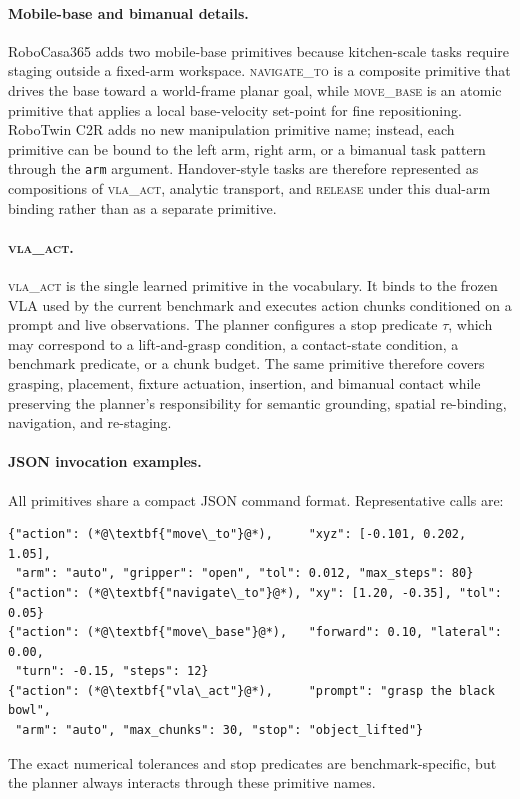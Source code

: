 \documentclass[11pt]{article}
\begin{document}
\paragraph{Mobile-base and bimanual details.}
RoboCasa365 adds two mobile-base primitives because kitchen-scale tasks require staging outside a fixed-arm workspace. \textsc{navigate\_to} is a composite primitive that drives the base toward a world-frame planar goal, while \textsc{move\_base} is an atomic primitive that applies a local base-velocity set-point for fine repositioning. RoboTwin C2R adds no new manipulation primitive name; instead, each primitive can be bound to the left arm, right arm, or a bimanual task pattern through the \texttt{arm} argument. Handover-style tasks are therefore represented as compositions of \textsc{vla\_act}, analytic transport, and \textsc{release} under this dual-arm binding rather than as a separate primitive.

\paragraph{\textsc{vla\_act}.}
\textsc{vla\_act} is the single learned primitive in the vocabulary. It binds to the frozen VLA used by the current benchmark and executes action chunks conditioned on a prompt and live observations. The planner configures a stop predicate $\tau$, which may correspond to a lift-and-grasp condition, a contact-state condition, a benchmark predicate, or a chunk budget. The same primitive therefore covers grasping, placement, fixture actuation, insertion, and bimanual contact while preserving the planner's responsibility for semantic grounding, spatial re-binding, navigation, and re-staging.

\paragraph{JSON invocation examples.}
All primitives share a compact JSON command format. Representative calls are:
\begin{lstlisting}
{"action": (*@\textbf{"move\_to"}@*),     "xyz": [-0.101, 0.202, 1.05],
 "arm": "auto", "gripper": "open", "tol": 0.012, "max_steps": 80}
{"action": (*@\textbf{"navigate\_to"}@*), "xy": [1.20, -0.35], "tol": 0.05}
{"action": (*@\textbf{"move\_base"}@*),   "forward": 0.10, "lateral": 0.00,
 "turn": -0.15, "steps": 12}
{"action": (*@\textbf{"vla\_act"}@*),     "prompt": "grasp the black bowl",
 "arm": "auto", "max_chunks": 30, "stop": "object_lifted"}
\end{lstlisting}
The exact numerical tolerances and stop predicates are benchmark-specific, but the planner always interacts through these primitive names.
\end{document}
